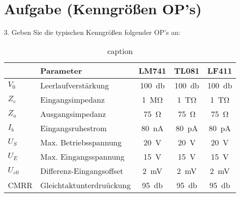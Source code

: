 \section{Aufgabe (Kenngrößen OP's)}%
\label{sec:aufgabe_3}

3. Geben Sie die typischen Kenngrößen folgender OP's an:

\begin{table}[h]
    \centering
    \caption{caption}
    \label{tab:label}
    \begin{tabular}{l l c c c}
        \toprule
        & Parameter & LM741 & TL081 & LF411 \\
        \midrule 
        $V_0$   & Leerlaufverstärkung   & \SI{100}{\decibel} &
        \SI{100}{\decibel} & \SI{100}{\decibel} \\
        $Z_e$   & Eingangsimpedanz      & \SI{1}{\mega\ohm} & \SI{1}{\tera\ohm} & \SI{1}{\tera\ohm} \\
        $Z_a$   & Ausgangsimpedanz      & \SI{75}{\ohm} & \SI{75}{\ohm} & \SI{75}{\ohm} \\
        $I_b$   & Eingangsruhestrom     & \SI{80}{\nano\ampere} &
        \SI{80}{\pico\ampere} & \SI{80}{\pico\ampere} \\
        $U_S$   & Max. Betriebsspannung & \SI{20}{\volt} & \SI{20}{\volt} & \SI{20}{\volt} \\
        $U_E$   & Max. Eingangsspannung & \SI{15}{\volt} & \SI{15}{\volt} & \SI{15}{\volt} \\
        $U_{e0}$& Differenz-Eingangsoffset & \SI{2}{\milli\volt} &
        \SI{2}{\milli\volt} & \SI{2}{\milli\volt} \\
        CMRR    & Gleichtaktunterdruückung & \SI{95}{\decibel} &
        \SI{95}{\decibel} & \SI{95}{\decibel}      \\
        \bottomrule
    \end{tabular}
\end{table}
